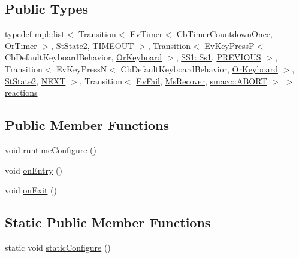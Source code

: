 \subsection*{Public Types}
\begin{DoxyCompactItemize}
\item 
typedef mpl\+::list$<$ Transition$<$ Ev\+Timer$<$ Cb\+Timer\+Countdown\+Once, \hyperlink{classsm__ferrari_1_1OrTimer}{Or\+Timer} $>$, \hyperlink{structsm__ferrari_1_1StState2}{St\+State2}, \hyperlink{structsm__ferrari_1_1StState1_1_1TIMEOUT}{T\+I\+M\+E\+O\+UT} $>$, Transition$<$ Ev\+Key\+PressP$<$ Cb\+Default\+Keyboard\+Behavior, \hyperlink{classsm__ferrari_1_1OrKeyboard}{Or\+Keyboard} $>$, \hyperlink{structsm__ferrari_1_1SS1_1_1Ss1}{S\+S1\+::\+Ss1}, \hyperlink{structsm__ferrari_1_1StState1_1_1PREVIOUS}{P\+R\+E\+V\+I\+O\+US} $>$, Transition$<$ Ev\+Key\+PressN$<$ Cb\+Default\+Keyboard\+Behavior, \hyperlink{classsm__ferrari_1_1OrKeyboard}{Or\+Keyboard} $>$, \hyperlink{structsm__ferrari_1_1StState2}{St\+State2}, \hyperlink{structsm__ferrari_1_1StState1_1_1NEXT}{N\+E\+XT} $>$, Transition$<$ \hyperlink{structsm__ferrari_1_1EvFail}{Ev\+Fail}, \hyperlink{classsm__ferrari_1_1MsRecover}{Ms\+Recover}, \hyperlink{structsmacc_1_1default__transition__tags_1_1ABORT}{smacc\+::\+A\+B\+O\+RT} $>$ $>$ \hyperlink{structsm__ferrari_1_1StState1_a45411e9ff7c49926bf5b5235155a523f}{reactions}
\end{DoxyCompactItemize}
\subsection*{Public Member Functions}
\begin{DoxyCompactItemize}
\item 
void \hyperlink{structsm__ferrari_1_1StState1_a8c04e573f6fb8c93d09153ab56d608a0}{runtime\+Configure} ()
\item 
void \hyperlink{structsm__ferrari_1_1StState1_a1b52a499d3ba8d68bfd50a076a97f085}{on\+Entry} ()
\item 
void \hyperlink{structsm__ferrari_1_1StState1_a1ad97c02d538952ea0f4657540e25d1b}{on\+Exit} ()
\end{DoxyCompactItemize}
\subsection*{Static Public Member Functions}
\begin{DoxyCompactItemize}
\item 
static void \hyperlink{structsm__ferrari_1_1StState1_a9b9203b9ef7001c90e76bbc687baae43}{static\+Configure} ()
\end{DoxyCompactItemize}

